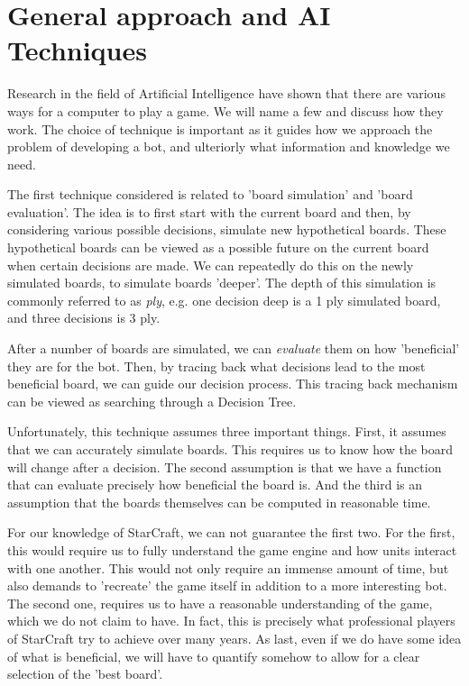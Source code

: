 \section{General approach and AI Techniques}
\label{sec:techniques}

Research in the field of Artificial Intelligence have shown that there are various ways for a computer to play a game. We will name a few and discuss how they work. The choice of technique is important as it guides how we approach the problem of developing a bot, and ulteriorly what information and knowledge we need.


The first technique considered is related to 'board simulation' and 'board evaluation'. The idea is to first start with the current board and then, by considering various possible decisions, simulate new hypothetical boards. These hypothetical boards can be viewed as a possible future on the current board when certain decisions are made. We can repeatedly do this on the newly simulated boards, to simulate boards 'deeper'. The depth of this simulation is commonly referred to as \emph{ply}, e.g. one decision deep is a 1 ply simulated board, and three decisions is 3 ply.

After a number of boards are simulated, we can \emph{evaluate} them on how 'beneficial' they are for the bot. Then, by tracing back what decisions lead to the most beneficial board, we can guide our decision process. This tracing back mechanism can be viewed as searching through a Decision Tree.

Unfortunately, this technique assumes three important things. First, it assumes that we can accurately simulate boards. This requires us to know how the board will change after a decision. The second assumption is that we have a function that can evaluate precisely how beneficial the board is. And the third is an assumption that the boards themselves can be computed in reasonable time.

For our knowledge of StarCraft, we can not guarantee the first two. For the first, this would require us to fully understand the game engine and how units interact with one another. This would not only require an immense amount of time, but also demands to 'recreate' the game itself in addition to a more interesting bot. The second one, requires us to have a reasonable understanding of the game, which we do not claim to have. In fact, this is precisely what professional players of StarCraft try to achieve over many years. As last, even if we do have some idea of what is beneficial, we will have to quantify somehow to allow for a clear selection of the 'best board'.

